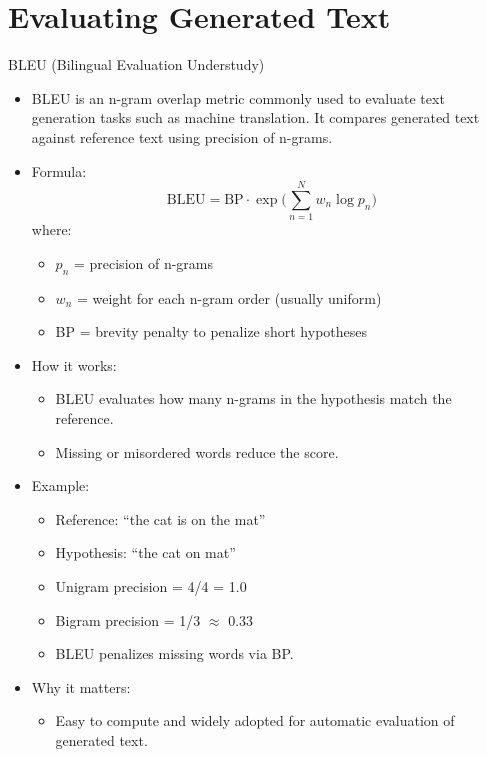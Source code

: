 \section{Evaluating Generated Text}

\begin{frame}[allowframebreaks]{BLEU (Bilingual Evaluation Understudy)}

\begin{itemize}
    \item BLEU is an n-gram overlap metric commonly used to evaluate text generation tasks such as machine translation.
    It compares generated text against reference text using precision of n-grams.

    \item Formula:
    \[
        \text{BLEU} = \text{BP} \cdot \exp\Bigg(\sum_{n=1}^{N} w_n \log p_n \Bigg)
    \]
    where:
    \begin{itemize}
        \item $p_n$ = precision of n-grams
        \item $w_n$ = weight for each n-gram order (usually uniform)
        \item BP = brevity penalty to penalize short hypotheses
    \end{itemize}
\framebreak
    \item How it works:
    \begin{itemize}
        \item BLEU evaluates how many n-grams in the hypothesis match the reference.
        \item Missing or misordered words reduce the score.
    \end{itemize}

    \item Example:
    \begin{itemize}
        \item Reference: ``the cat is on the mat''
        \item Hypothesis: ``the cat on mat''
        \item Unigram precision = 4/4 = 1.0
        \item Bigram precision = 1/3 $\approx$ 0.33
        \item BLEU penalizes missing words via BP.
    \end{itemize}

    \item Why it matters:
    \begin{itemize}
        \item Easy to compute and widely adopted for automatic evaluation of generated text.
    \end{itemize}
\end{itemize}

\end{frame}


